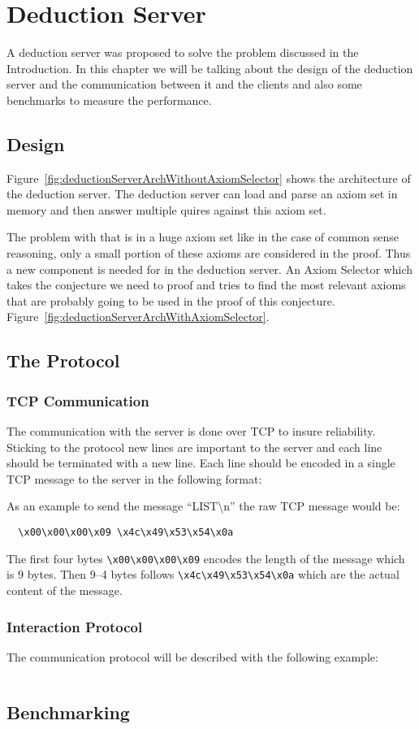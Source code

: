 \chapter{Deduction Server}
A deduction server was proposed to solve the problem discussed in the Introduction. In this chapter we will be talking about the design of the deduction server and the communication between it and the clients and also some benchmarks to measure the performance.
\section{Design}
Figure~\ref{fig:deductionServerArchWithoutAxiomSelector} shows the architecture of the deduction server. The deduction server can load and parse an axiom set in memory and then answer multiple quires against this axiom set.

The problem with that is in a huge axiom set like in the case of common sense reasoning, only a small portion of these axioms are considered in the proof. Thus a new component is needed for in the deduction server. An Axiom Selector which takes the conjecture we need to proof and tries to find the most relevant axioms that are probably going to be used in the proof of this conjecture. Figure~\ref{fig:deductionServerArchWithAxiomSelector}.

\section{The Protocol}
\subsection{TCP Communication}\label{subsec:tcpCommunication}
The communication with the server is done over TCP to insure reliability. Sticking to the protocol new lines are important to the server and each line should be terminated with a new line. Each line should be encoded in a single TCP message to the server in the following format:

As an example to send the message ``LIST\textbackslash{}n'' the raw TCP message would be:
\begin{lstlisting}
  \x00\x00\x00\x09 \x4c\x49\x53\x54\x0a
\end{lstlisting}
The first four bytes \lstinline{\x00\x00\x00\x09} encodes the length of the message which is 9 bytes. Then 9--4 bytes follows \lstinline{\x4c\x49\x53\x54\x0a} which are the actual content of the message.
\subsection{Interaction Protocol}\label{subsec:interactionProtocol}
The communication protocol will be described with the following example:
\begin{lstlisting}

\end{lstlisting}

\section{Benchmarking}
